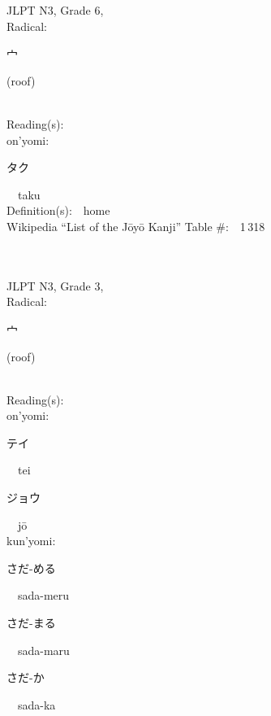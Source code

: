 \begin{multicols}{2}
{JLPT N3, Grade 6, \\Radical:\ \ {\begin{CJK}{UTF8}{min} 宀 \end{CJK}} (roof) } \\
Reading(s):\ \ \\
{\hspace*{1em}}on'yomi:\ \ \\
{\hspace*{2em}}{\begin{CJK}{UTF8}{min} タク \end{CJK}}\ \ taku\ \ \\
Definition(s):\ \ home \\
Wikipedia ``List of the J\=oy\=o Kanji'' Table \#:\ \ 1\,318 \\
\ \ \\
{\fontsize{34pt}{40pt}  }\ \ \\  %
{JLPT N3, Grade 3, \\Radical:\ \ {\begin{CJK}{UTF8}{min} 宀 \end{CJK}} (roof) } \\
Reading(s):\ \ \\
{\hspace*{1em}}on'yomi:\ \ \\
{\hspace*{2em}}{\begin{CJK}{UTF8}{min} テイ \end{CJK}}\ \ tei\ \ \\
{\hspace*{2em}}{\begin{CJK}{UTF8}{min} ジョウ \end{CJK}}\ \ j\=o\ \ \\
{\hspace*{1em}}kun'yomi:\ \ \\
{\hspace*{2em}}{\begin{CJK}{UTF8}{min} さだ-める \end{CJK}}\ \ sada-meru\ \ \\
{\hspace*{2em}}{\begin{CJK}{UTF8}{min} さだ-まる \end{CJK}}\ \ sada-maru\ \ \\
{\hspace*{2em}}{\begin{CJK}{UTF8}{min} さだ-か \end{CJK}}\ \ sada-ka\ \ \\

\end{multicols}
